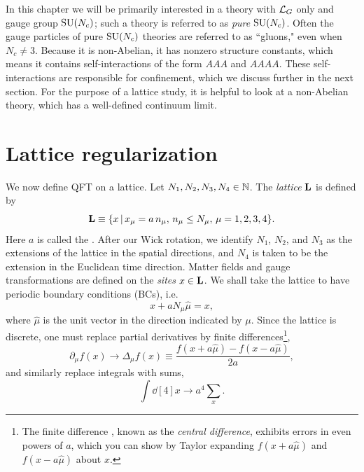 In this chapter we will be primarily interested in a theory with 
$\mathcal{L}_G$ only and gauge group $\operatorname{SU}(N_c)$; such a theory is referred
to as {\it pure} $\operatorname{SU}(N_c)$.
Often the gauge particles of pure $\operatorname{SU}(N_c)$ theories are referred
to as ``gluons," even when $N_c\neq 3$. Because it
is non-Abelian, it has nonzero structure constants, which means it
contains self-interactions of the form $AAA$ and $AAAA$. 
These self-interactions are responsible for confinement, which we discuss
further in the next section. 
For the purpose of a lattice study,
it is helpful to look at a non-Abelian theory, which
has a well-defined continuum limit.

\section{Lattice regularization}\label{sec:latreg}
We now define QFT on a lattice. Let $N_{1},N_{2},N_{3},N_{4}
\in \mathbb{N}$. The {\it lattice} ${\mathbf L}$ is defined by
\begin{equation}
  {\mathbf L}\equiv\{x\,|\,x_\mu=a\,n_\mu,\,n_\mu\le N_\mu,\,
      \mu=1,2,3,4\}.
\end{equation}
Here $a$ is called the . 
After our Wick rotation, we identify $N_1$, $N_2$, and $N_3$
as the extensions of the lattice in the spatial directions,
and $N_4$ is taken to be the extension in the Euclidean time 
direction. Matter fields and gauge 
transformations are defined on the  {\it sites} $x\in\mathbf L$. We shall 
take the lattice to have periodic boundary conditions (BCs), i.e.
\begin{equation}\label{eq:PBC}
  x+aN_{\mu}\hat{\mu}=x,
\end{equation}
where $\hat{\mu}$ is the unit vector in the direction indicated by $\mu$. 
Since the lattice is discrete, one must replace partial derivatives 
by finite differences\footnote{The finite difference ,
known as the {\it central difference},
exhibits errors in even powers of $a$, which you can show by Taylor
expanding $f(x+a\hat{\mu})$ and $f(x-a\hat{\mu})$ about $x$.}, 
\begin{equation}\label{eq:dertodiff}
  \partial_\mu f(x)\to\Delta_{\mu}f(x)\equiv\frac{f(x+a\hat{\mu})
                                                   -f(x-a\hat{\mu})}{2a},
\end{equation}
and similarly replace integrals with sums,
\begin{equation}\label{eq:inttosum}
  \int \dd[4]{x}\to a^4\sum_x.
\end{equation}
